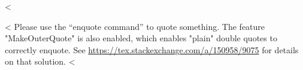 <%

<%
Please use the \enquote{enquote command} to quote something.
The feature "MakeOuterQuote" is also enabled, which enables "plain" double quotes to correctly enquote.
See \url{https://tex.stackexchange.com/a/150958/9075} for details on that solution.
<%
